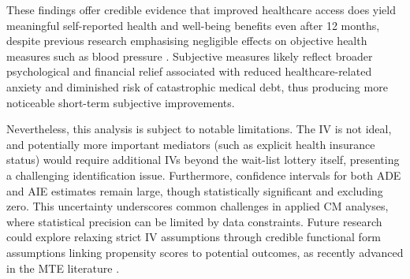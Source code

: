 These findings offer credible evidence that improved healthcare access does yield meaningful self-reported health and well-being benefits even after 12 months, despite previous research emphasising negligible effects on objective health measures such as blood pressure \citep{baicker2013oregon}.
Subjective measures likely reflect broader psychological and financial relief associated with reduced healthcare-related anxiety and diminished risk of catastrophic medical debt, thus producing more noticeable short-term subjective improvements.

Nevertheless, this analysis is subject to notable limitations.
The IV is not ideal, and potentially more important mediators (such as explicit health insurance status) would require additional IVs beyond the wait-list lottery itself, presenting a challenging identification issue.
Furthermore, confidence intervals for both ADE and AIE estimates remain large, though statistically significant and excluding zero.
This uncertainty underscores common challenges in applied CM analyses, where statistical precision can be limited by data constraints.
Future research could explore relaxing strict IV assumptions through credible functional form assumptions linking propensity scores to potential outcomes, as recently advanced in the MTE literature \citep{pan2024marginal}.
